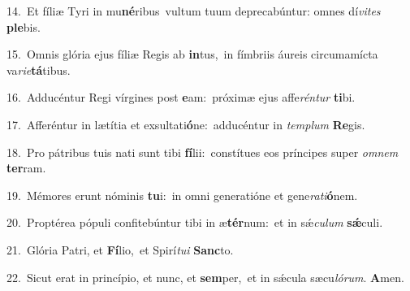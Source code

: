 {\numbfont\textcolor{\numbcolor}{14.}}~Et fíliæ Tyri in mu\-\textbf{né}\-ribus~\star vultum tuum deprecabúntur: omnes dí\-\textit{vi}\-\textit{tes} \textbf{ple}\-bis.\par
{\numbfont\textcolor{\numbcolor}{15.}}~Omnis glória ejus fíliæ Regis ab \textbf{in}\-tus,~\star in fímbriis áureis circumamícta va\-\textit{ri}\-\textit{e}\textbf{tá}tibus.\par
{\numbfont\textcolor{\numbcolor}{16.}}~Adducéntur Regi vírgines post \textbf{e}\-am:~\star próximæ ejus affe\-\textit{rén}\-\textit{tur} \textbf{ti}\-bi.\par
{\numbfont\textcolor{\numbcolor}{17.}}~Afferéntur in lætítia et exsultati\-\textbf{ó}\-ne:~\star adducéntur in \textit{tem}\-\textit{plum} \textbf{Re}\-gis.\par
{\numbfont\textcolor{\numbcolor}{18.}}~Pro pátribus tuis nati sunt tibi \textbf{fí}\-lii:~\star constítues eos príncipes super \textit{om}\-\textit{nem} \textbf{ter}\-ram.\par
{\numbfont\textcolor{\numbcolor}{19.}}~Mémores erunt nóminis \textbf{tu}\-i:~\star in omni generatióne et gene\-\textit{ra}\-\textit{ti}\textbf{ó}nem.\par
{\numbfont\textcolor{\numbcolor}{20.}}~Proptérea pópuli confitebúntur tibi in æ\-\textbf{tér}\-num:~\star et in sǽ\-\textit{cu}\-\textit{lum} \textbf{sǽ}\-culi.\par
{\numbfont\textcolor{\numbcolor}{21.}}~Glória Patri, et \textbf{Fí}\-lio,~\star et Spirí\-\textit{tu}\-\textit{i} \textbf{Sanc}\-to.\par
{\numbfont\textcolor{\numbcolor}{22.}}~Sicut erat in princípio, et nunc, et \textbf{sem}\-per,~\star et in sǽcula sæcu\-\textit{ló}\-\textit{rum}. \textbf{A}\-men.\par
